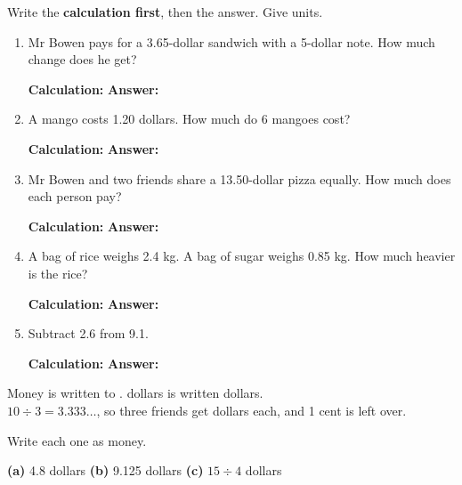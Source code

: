 \documentclass[12pt,a4paper]{article}
\newif\iffr
\newcommand{\fr}[1]{\unskip\iffr\par\vspace{1pt}\noindent{\small\itshape\color{black!60}#1}\par\fi}
\newcommand{\calcans}[1][6.6cm]{\par\vspace{5pt}\noindent\hspace*{1.6em}%
  \textbf{Calculation:} \blank[#1] \hfill \textbf{Answer:} \blank[3.0cm]\par}
\begin{document}
\vspace{2pt}
\noindent Write the \textbf{calculation first}, then the answer. Give units.
\fr{\'Ecris d'abord le calcul (\eng{calculation}), puis le r\'esultat avec son
unit\'e.}

\begin{enumerate}[label=(\alph*), itemsep=6pt]
  \item Mr Bowen pays for a 3.65-dollar sandwich with a 5-dollar note. How much
        change does he get?
        \fr{Mr Bowen paie un sandwich \`a 3.65 dollars avec un billet de 5 dollars.
        Combien de monnaie (\eng{change}) lui rend-on~?}
        \calcans
  \item A mango costs 1.20 dollars. How much do 6 mangoes cost?
        \fr{Une mangue co\^ute 1.20 dollar. Combien co\^utent 6 mangues~?}
        \calcans
  \item Mr Bowen and two friends share a 13.50-dollar pizza equally. How much does
        each person pay?
        \fr{Mr Bowen et deux amis se partagent \'equitablement (\eng{share equally})
        une pizza \`a 13.50 dollars. Combien chacun paie-t-il~?}
        \calcans
  \item A bag of rice weighs 2.4 kg. A bag of sugar weighs 0.85 kg. How much
        heavier is the rice?
        \fr{Un sac de riz p\`ese 2.4 kg et un sac de sucre 0.85 kg. De combien le
        riz est-il plus lourd (\eng{how much heavier})~?}
        \calcans
  \item Subtract 2.6 from 9.1.
        \fr{Soustrais 2.6 de 9.1.}
        \calcans
\end{enumerate}


\begin{remember}[Money]
  Money is written to .  dollars is written  dollars. \\
  $10 \div 3 = 3.333\ldots$, so three friends get  dollars each, and
  1 cent is left over.
  \fr{Une somme d'argent s'\'ecrit avec 2 chiffres apr\`es la virgule (\eng{2
  decimal places})~: 4.5 dollars s'\'ecrit 4.50 dollars.}
\end{remember}

\vspace{6pt}
\noindent Write each one as money.
\fr{\'Ecris chaque somme avec 2 chiffres apr\`es la virgule.}

\vspace{6pt}
\noindent\hspace*{1.6em}\textbf{(a)} 4.8 dollars \; \blank[2.0cm] \hfill
\textbf{(b)} 9.125 dollars \; \blank[2.0cm] \hfill
\textbf{(c)} $15 \div 4$ dollars \; \blank[2.0cm]
\par\vspace{10pt}
\end{document}
